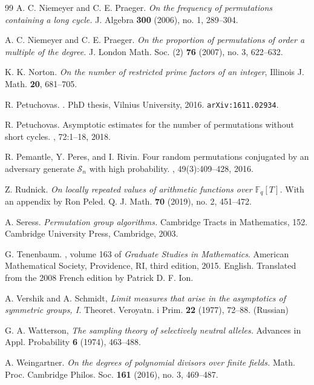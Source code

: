 \documentclass[10pt]{article}
\renewcommand{\(}{\left(}
\renewcommand{\)}{\right)}
\begin{document}
\begin{thebibliography}{99}
{\sc A. C. Niemeyer and C. E. Praeger}.
\emph{On the frequency of permutations containing a long cycle.} 
J. Algebra {\bf 300} (2006), no. 1, 289--304. 

{\sc A. C. Niemeyer and C. E. Praeger}.
\emph{On the proportion of permutations of order a multiple of the degree.}
J. London Math. Soc. (2) {\bf 76} (2007), no. 3, 622--632. 

{\sc K. K. Norton}.  \emph{On the number of restricted prime factors of
an integer}, Illinois J. Math. {\bf 20}, 681--705.

{\sc R. Petuchovas.}
.
\newblock PhD thesis, Vilnius University, 2016.
\newblock \texttt{arXiv:1611.02934}.

{\sc R. Petuchovas.}
\newblock Asymptotic estimates for the number of permutations without short
  cycles.
, 72:1--18, 2018.


{\sc R. Pemantle, Y. Peres, and I. Rivin.}
\newblock Four random permutations conjugated by an adversary generate
  {$\mathcal{S}_n$} with high probability.
, 49(3):409--428, 2016.

{\sc Z. Rudnick}.
\emph{On locally repeated values of arithmetic functions over $\mathbb{F}_q[T]$.}
With an appendix by Ron Peled.
Q. J. Math. {\bf 70} (2019), no. 2, 451--472. 
%

{\sc A. Seress}.
\emph{Permutation group algorithms.}
Cambridge Tracts in Mathematics, 152. Cambridge University Press, Cambridge, 2003.

{\sc G. Tenenbaum.}
,
  volume 163 of {\em Graduate Studies in Mathematics}.
\newblock American Mathematical Society, Providence, RI, third edition, 2015.
\newblock English. Translated from the 2008 French edition by Patrick D. F. Ion.

%
%
%
%
%
%
%

{\sc A. Vershik and A. Schmidt},
\emph{Limit measures that arise in the asymptotics of symmetric groups, I.}
Theoret. Veroyatn. i Prim. {\bf 22} (1977), 72--88.  (Russian)

{\sc G. A. Watterson},
\emph{The sampling theory of selectively neutral alleles.}
Advances in Appl. Probability {\bf 6} (1974), 463--488. 

{\sc A. Weingartner}.
\emph{On the degrees of polynomial divisors over finite fields.} 
Math. Proc. Cambridge Philos. Soc. {\bf 161} (2016), no. 3, 469--487. 
%



\end{thebibliography}
\end{document}
